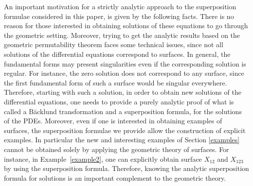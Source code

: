 \documentclass[pdftex]{sigma}
\numberwithin{equation}{section}
\begin{document}
 An important motivation for a strictly analytic approach to the superposition formulae considered in this paper, is given by the following facts. There is no reason for those interested in obtaining solutions of these equations to go through the geometric setting. Moreover, trying to get the analytic results based on the geometric permutability theorem faces some technical issues, since not all solutions of the differential equations correspond to surfaces. In general, the fundamental forms may present singularities even if the corresponding solution is regular. For instance, the zero solution does not correspond to any surface, since the first fundamental form of such a surface would be singular everywhere. Therefore, starting with such a solution, in order to obtain new solutions of the differential equations, one needs to provide a purely analytic proof of what is called a B\"acklund transformation and a superposition formula, for the solutions of the PDEs. Moreover, even if one is interested in obtaining examples of surfaces, the superposition formulae we provide allow the construction of explicit examples. In particular the new and interesting examples of Section \ref{examples} cannot be obtained solely by applying the geometric theory of surfaces. For instance, in Example~\ref{example2}, one can explicitly obtain surface $X_{12}$ and $X_{123}$ by using the superposition formula. Therefore, knowing the analytic superposition formula for solutions is an important complement to the geometric theory.
\end{document}
